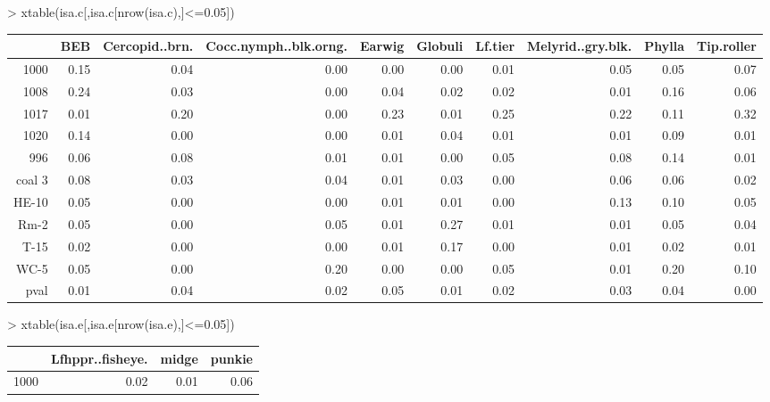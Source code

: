 \documentclass[12pt]{article}
\begin{document}
\begin{Schunk}
\begin{Sinput}
> xtable(isa.c[,isa.c[nrow(isa.c),]<=0.05])
\end{Sinput}
\begin{table}[ht]
\begin{center}
\begin{tabular}{rrrrrrrrrr}
  \hline
 & BEB & Cercopid..brn. & Cocc.nymph..blk.orng. & Earwig & Globuli & Lf.tier & Melyrid..gry.blk. & Phylla & Tip.roller \\ 
  \hline
1000 & 0.15 & 0.04 & 0.00 & 0.00 & 0.00 & 0.01 & 0.05 & 0.05 & 0.07 \\ 
  1008 & 0.24 & 0.03 & 0.00 & 0.04 & 0.02 & 0.02 & 0.01 & 0.16 & 0.06 \\ 
  1017 & 0.01 & 0.20 & 0.00 & 0.23 & 0.01 & 0.25 & 0.22 & 0.11 & 0.32 \\ 
  1020 & 0.14 & 0.00 & 0.00 & 0.01 & 0.04 & 0.01 & 0.01 & 0.09 & 0.01 \\ 
  996 & 0.06 & 0.08 & 0.01 & 0.01 & 0.00 & 0.05 & 0.08 & 0.14 & 0.01 \\ 
  coal 3 & 0.08 & 0.03 & 0.04 & 0.01 & 0.03 & 0.00 & 0.06 & 0.06 & 0.02 \\ 
  HE-10 & 0.05 & 0.00 & 0.00 & 0.01 & 0.01 & 0.00 & 0.13 & 0.10 & 0.05 \\ 
  Rm-2 & 0.05 & 0.00 & 0.05 & 0.01 & 0.27 & 0.01 & 0.01 & 0.05 & 0.04 \\ 
  T-15 & 0.02 & 0.00 & 0.00 & 0.01 & 0.17 & 0.00 & 0.01 & 0.02 & 0.01 \\ 
  WC-5 & 0.05 & 0.00 & 0.20 & 0.00 & 0.00 & 0.05 & 0.01 & 0.20 & 0.10 \\ 
  pval & 0.01 & 0.04 & 0.02 & 0.05 & 0.01 & 0.02 & 0.03 & 0.04 & 0.00 \\ 
   \hline
\end{tabular}
\end{center}
\end{table}\begin{Sinput}
> xtable(isa.e[,isa.e[nrow(isa.e),]<=0.05])
\end{Sinput}
\begin{table}[ht]
\begin{center}
\begin{tabular}{rrrr}
  \hline
 & Lfhppr..fisheye. & midge & punkie \\ 
  \hline
1000 & 0.02 & 0.01 & 0.06 \\ 

\end{tabular}
\end{center}
\end{table}
\end{Schunk}
\end{document}

